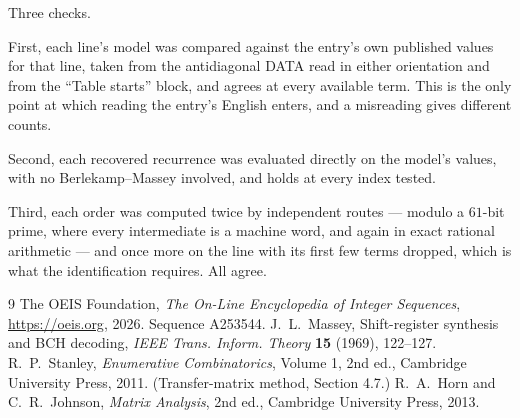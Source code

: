 \documentclass[11pt,a4paper]{article}
\theoremstyle{plain}
\theoremstyle{definition}
\begin{document}
Three checks.

First, each line's model was compared against the entry's own published values for that line,
taken from the antidiagonal DATA read in either orientation and from the ``Table starts''
block, and agrees at every available term. This is the only point at which reading the entry's
English enters, and a misreading gives different counts.

Second, each recovered recurrence was evaluated directly on the model's values, with no
Berlekamp--Massey involved, and holds at every index tested.

Third, each order was computed twice by independent routes --- modulo a $61$-bit prime, where
every intermediate is a machine word, and again in exact rational arithmetic --- and once more
on the line with its first few terms dropped, which is what the identification requires. All
agree.

\begin{thebibliography}{9}
 The OEIS Foundation, \emph{The On-Line Encyclopedia of Integer
Sequences}, \url{https://oeis.org}, 2026. Sequence A253544.
 J.~L.~Massey, Shift-register synthesis and BCH decoding, \emph{IEEE
Trans. Inform. Theory} \textbf{15} (1969), 122--127.
 R.~P.~Stanley, \emph{Enumerative Combinatorics}, Volume 1, 2nd ed.,
Cambridge University Press, 2011. (Transfer-matrix method, Section 4.7.)
 R.~A.~Horn and C.~R.~Johnson, \emph{Matrix Analysis}, 2nd ed., Cambridge
University Press, 2013.
\end{thebibliography}
\end{document}
